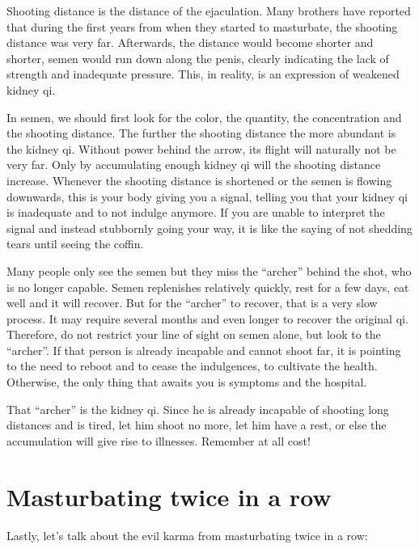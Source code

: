 \documentclass[
]{book}
\begin{document}
Shooting distance is the distance of the ejaculation. Many brothers have reported that during the first years from when they started to masturbate, the shooting distance was very far. Afterwards, the distance would become shorter and shorter, semen would run down along the penis, clearly indicating the lack of strength and inadequate pressure. This, in reality, is an expression of weakened kidney qi.

In semen, we should first look for the color, the quantity, the concentration and the shooting distance. The further the shooting distance the more abundant is the kidney qi. Without power behind the arrow, its flight will naturally not be very far. Only by accumulating enough kidney qi will the shooting distance increase. Whenever the shooting distance is shortened or the semen is flowing downwards, this is your body giving you a signal, telling you that your kidney qi is inadequate and to not indulge anymore. If you are unable to interpret the signal and instead stubbornly going your way, it is like the saying of not shedding tears until seeing the coffin.

Many people only see the semen but they miss the ``archer'' behind the shot, who is no longer capable. Semen replenishes relatively quickly, rest for a few days, eat well and it will recover. But for the ``archer'' to recover, that is a very slow process. It may require several months and even longer to recover the original qi. Therefore, do not restrict your line of sight on semen alone, but look to the ``archer''. If that person is already incapable and cannot shoot far, it is pointing to the need to reboot and to cease the indulgences, to cultivate the health. Otherwise, the only thing that awaits you is symptoms and the hospital.

That ``archer'' is the kidney qi. Since he is already incapable of shooting long distances and is tired, let him shoot no more, let him have a rest, or else the accumulation will give rise to illnesses. Remember at all cost!

\hypertarget{masturbating-twice-in-a-row}{%
\section{Masturbating twice in a row}\label{masturbating-twice-in-a-row}}

Lastly, let's talk about the evil karma from masturbating twice in a row:
\end{document}
